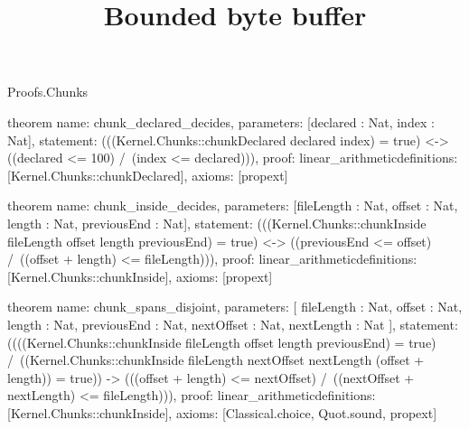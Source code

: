 \begin{lexlean}{Proofs.Chunks}
\title{Bounded byte buffer}
\begin{semanticmodule}
theorem{
  name: chunk_declared_decides,
  parameters: [declared : Nat, index : Nat],
  statement: (((Kernel.Chunks::chunkDeclared declared index) = true) <-> ((declared <= 100) /\ (index <= declared))),
  proof: linear_arithmetic{definitions: [Kernel.Chunks::chunkDeclared]},
  axioms: [propext]
}

theorem{
  name: chunk_inside_decides,
  parameters: [fileLength : Nat, offset : Nat, length : Nat, previousEnd : Nat],
  statement: (((Kernel.Chunks::chunkInside fileLength offset length previousEnd) = true) <-> ((previousEnd <= offset) /\ ((offset + length) <= fileLength))),
  proof: linear_arithmetic{definitions: [Kernel.Chunks::chunkInside]},
  axioms: [propext]
}

theorem{
  name: chunk_spans_disjoint,
  parameters: [
    fileLength : Nat,
    offset : Nat,
    length : Nat,
    previousEnd : Nat,
    nextOffset : Nat,
    nextLength : Nat
  ],
  statement: ((((Kernel.Chunks::chunkInside fileLength offset length previousEnd) = true) /\ ((Kernel.Chunks::chunkInside fileLength nextOffset nextLength (offset + length)) = true)) -> (((offset + length) <= nextOffset) /\ ((nextOffset + nextLength) <= fileLength))),
  proof: linear_arithmetic{definitions: [Kernel.Chunks::chunkInside]},
  axioms: [Classical.choice, Quot.sound, propext]
}
\end{semanticmodule}
\end{lexlean}
